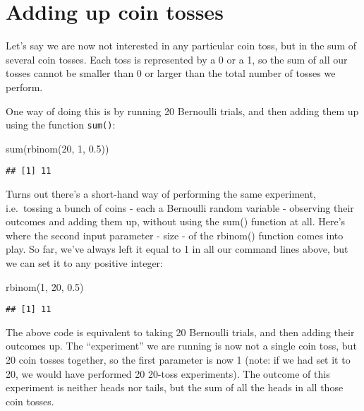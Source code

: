 \documentclass[
]{book}
\newenvironment{Shaded}{\begin{snugshade}}{\end{snugshade}}
\newcommand{\DecValTok}[1]{\textcolor[rgb]{0.00,0.00,0.81}{#1}}
\newcommand{\FloatTok}[1]{\textcolor[rgb]{0.00,0.00,0.81}{#1}}
\newcommand{\FunctionTok}[1]{\textcolor[rgb]{0.00,0.00,0.00}{#1}}
\newcommand{\NormalTok}[1]{#1}
\begin{document}
\hypertarget{adding-up-coin-tosses}{%
\section{Adding up coin tosses}\label{adding-up-coin-tosses}}

Let's say we are now not interested in any particular coin toss, but in the sum of several coin tosses. Each toss is represented by a 0 or a 1, so the sum of all our tosses cannot be smaller than 0 or larger than the total number of tosses we perform.

One way of doing this is by running 20 Bernoulli trials, and then adding them up using the function \texttt{sum()}:

\begin{Shaded}
\begin{Highlighting}[]
\FunctionTok{sum}\NormalTok{(}\FunctionTok{rbinom}\NormalTok{(}\DecValTok{20}\NormalTok{, }\DecValTok{1}\NormalTok{, }\FloatTok{0.5}\NormalTok{))}
\end{Highlighting}
\end{Shaded}

\begin{verbatim}
## [1] 11
\end{verbatim}

Turns out there's a short-hand way of performing the same experiment, i.e.~tossing a bunch of coins - each a Bernoulli random variable - observing their outcomes and adding them up, without using the sum() function at all. Here's where the second input parameter - size - of the rbinom() function comes into play. So far, we've always left it equal to 1 in all our command lines above, but we can set it to any positive integer:

\begin{Shaded}
\begin{Highlighting}[]
\FunctionTok{rbinom}\NormalTok{(}\DecValTok{1}\NormalTok{, }\DecValTok{20}\NormalTok{, }\FloatTok{0.5}\NormalTok{)}
\end{Highlighting}
\end{Shaded}

\begin{verbatim}
## [1] 11
\end{verbatim}

The above code is equivalent to taking 20 Bernoulli trials, and then adding their outcomes up. The ``experiment'' we are running is now not a single coin toss, but 20 coin tosses together, so the first parameter is now 1 (note: if we had set it to 20, we would have performed 20 20-toss experiments). The outcome of this experiment is neither heads nor tails, but the sum of all the heads in all those coin tosses.
\end{document}
